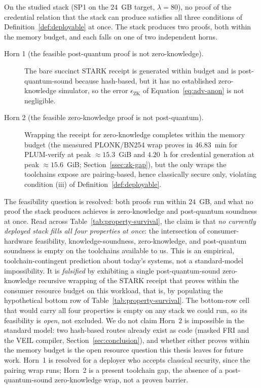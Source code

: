 \begin{proposition}\label{prop:wall}
    On the studied stack (SP1 on the $24$~GB target, $\lambda=80$), no proof of the credential relation that the stack can produce satisfies all three conditions of Definition~\ref{def:deployable} at once. The stack produces two proofs, both within the memory budget, and each falls on one of two independent horns.
    \begin{description}
      \item[Horn 1 (the feasible post-quantum proof is not zero-knowledge).] The bare succinct STARK receipt is generated within budget and is post-quantum-sound because hash-based, but it has no established zero-knowledge simulator, so the error $\epsilon_{\mathrm{ZK}}$ of Equation~\eqref{eq:adv-anon} is not negligible.
      \item[Horn 2 (the feasible zero-knowledge proof is not post-quantum).] Wrapping the receipt for zero-knowledge completes within the memory budget (the measured PLONK/BN254 wrap proves in $46.83$~min for PLUM-verify at peak $\approx15.3$~GiB and $4.20$~h for credential generation at peak $\approx15.6$~GiB; Section~\ref{ssec:zk-gap}), but the only wraps the toolchains expose are pairing-based, hence classically secure only, violating condition (iii) of Definition~\ref{def:deployable}.
    \end{description}
    The feasibility question is resolved: both proofs run within $24$~GB, and what no proof the stack produces achieves is zero-knowledge and post-quantum soundness at once. Read across Table~\ref{tab:property-survival}, the claim is that \emph{no currently deployed stack fills all four properties at once}: the intersection of consumer-hardware feasibility, knowledge-soundness, zero-knowledge, and post-quantum soundness is empty on the toolchains available to us. This is an empirical, toolchain-contingent prediction about today's systems, not a standard-model impossibility. It is \emph{falsified} by exhibiting a single post-quantum-sound zero-knowledge recursive wrapping of the STARK receipt that proves within the consumer resource budget on this workload, that is, by populating the hypothetical bottom row of Table~\ref{tab:property-survival}. The bottom-row cell that would carry all four properties is empty on any stack we could run, so its feasibility is \emph{open}, not excluded. We do not claim Horn~2 is impossible in the standard model: two hash-based routes already exist as code (masked FRI and the VEIL compiler, Section~\ref{sec:conclusion}), and whether either proves within the memory budget is the open resource question this thesis leaves for future work. Horn~1 is resolved for a deployer who accepts classical security, since the pairing wrap runs; Horn~2 is a present toolchain gap, the absence of a post-quantum-sound zero-knowledge wrap, not a proven barrier.
\end{proposition}


